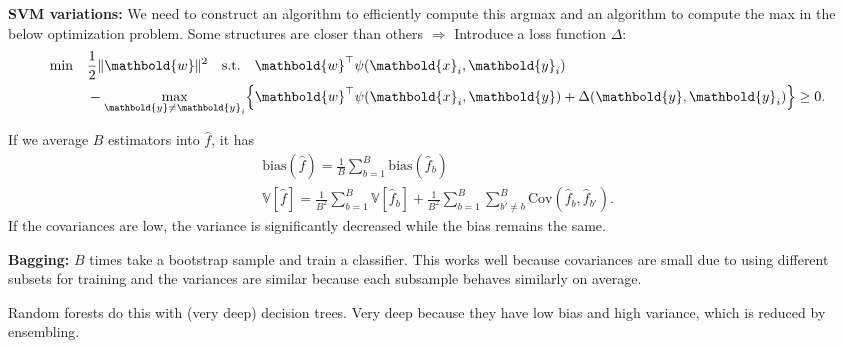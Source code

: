\documentclass[9pt]{extarticle}
\newenvironment{topic}[1]
{\textbf{\sffamily \colorbox{black}{\rlap{\textbf{\textcolor{white}{#1}}}\hspace{\linewidth}\hspace{-2\fboxsep}}}}
{}
\newenvironment{subtopic}[1]
{\textbf{\sffamily #1:}}
{}
\renewcommand{\vec}[1]{\ensuremath{\mathbold{#1}}}
\renewcommand{\Var}{\mathbb{V}}
\begin{document}
\begin{multicols*}{3}
\begin{topic}{Convex optimization and SVMs}
\begin{subtopic}{SVM variations}
            We need to construct an algorithm to efficiently compute this argmax and an algorithm to compute
            the max in the below optimization problem. Some structures are closer than others $\Rightarrow$
            Introduce a loss function $\Delta$:
            \begin{align*}
                \text{min} & \quad \frac{1}{2} \| \vec{w} \|^2 \quad \text{s.t.} \quad \transpose{\vec{w}} \psi(\vec{x}_i, \vec{y}_i)                               \\
                           & \quad  - \max_{\vec{y} \neq \vec{y}_i} \lft\{ \transpose{\vec{w}} \psi(\vec{x}_i, \vec{y}) + \Delta(\vec{y}, \vec{y}_i) \rgt\} \geq 0.
            \end{align*}
        \end{subtopic}

    \end{topic}

    \begin{topic}{Ensembles}
        If we average $B$ estimators into $\hat{f}$, it has
        \begin{gather*}
            \mathrm{bias}(\hat{f}) = \frac{1}{B} \sum_{b=1}^{B} \mathrm{bias}(\hat{f}_b)                                                                                     \\
            \Var[\hat{f}]          = \frac{1}{B^2} \sum_{b=1}^{B} \Var[\hat{f}_b] + \frac{1}{B^2} \sum_{b=1}^{B} \sum_{b' \neq b}^{B} \mathrm{Cov}(\hat{f}_b, \hat{f}_{b'}).
        \end{gather*}
        If the covariances are low, the variance is significantly decreased while the bias remains the same.

        \begin{subtopic}{Bagging}
            $B$ times take a bootstrap sample and train a classifier. This works well because
            covariances are small due to using different subsets for training and the variances are
            similar because each subsample behaves similarly on average.

            Random forests do this with (very deep) decision trees. Very deep because they have low bias and
            high variance, which is reduced by ensembling.

        \end{subtopic}


\end{topic}
\end{multicols*}
\end{document}
